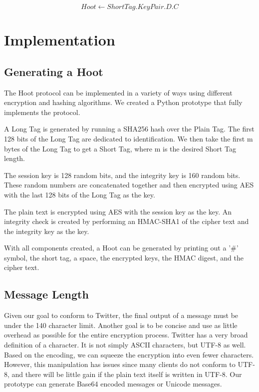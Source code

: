 \documentclass{acm_proc_article-sp}
\begin{document}
\begin{equation}
	Hoot \leftarrow ShortTag.KeyPair.D.C
\end{equation}

\section{Implementation}

\subsection{Generating a Hoot}

The Hoot protocol can be implemented in a variety of ways using different encryption and hashing algorithms. We created a Python prototype that fully implements the protocol.

A Long Tag is generated by running a SHA256 hash over the Plain Tag. The first 128 bits of the Long Tag are dedicated to identification. We then take the first m bytes of the Long Tag to get a Short Tag, where m is the desired Short Tag length.

The session key is 128 random bits, and the integrity key is 160 random bits. These random numbers are concatenated together and then encrypted using AES with the last 128 bits of the Long Tag as the key.

The plain text is encrypted using AES with the session key as the key. An integrity check is created by performing an HMAC-SHA1 of the cipher text and the integrity key as the key.

With all components created, a Hoot can be generated by printing out a '\#' symbol,  the short tag, a space, the encrypted keys, the HMAC digest, and the cipher text.

\subsection{Message Length}

Given our goal to conform to Twitter, the final output of a message must be under the 140 character limit. Another goal is to be concise and use as little overhead as possible for the entire encryption process. Twitter has a very broad definition of a character. It is not simply ASCII characters, but UTF-8 as well. Based on the encoding, we can squeeze the encryption into even fewer characters. However, this manipulation has issues since many clients do not conform to UTF-8, and there will be little gain if the plain text itself is written in UTF-8. Our prototype can generate Base64 encoded messages or Unicode messages.
\end{document}
